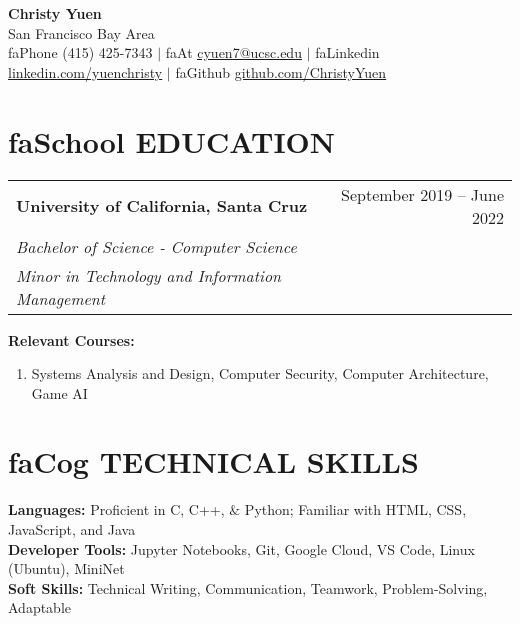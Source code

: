 \documentclass[a4paper,11pt]{article}
\makeatletter
\newcommand{\seticon}[1]{\textcolor{Cerulean}{\csname #1\endcsname}}
\newcommand{\resumeSub}[6]{ %
  \vspace{-2pt}\item
    \begin{tabular*}{0.97\textwidth}[t]{l@{\extracolsep{\fill}}r}
      \textbf{#1} & #2 \\
      \textit{\small#3} & \textnormal{\small #4} \\
      \textit{\small#5} & \textnormal{\small #6} \\
    \end{tabular*}\vspace{-8pt}
}
\newcommand{\resumeSubHeadingListStart}{\begin{itemize}[leftmargin=0.15in, label={}]}
\newcommand{\resumeSubHeadingListEnd}{\end{itemize}}
\makeatother
\begin{document}
\iffalse
\begin{wrapfigure}{R}{0.15\textwidth}
\vspace{-25pt}
\texttt{[image: dp\_cropped]}
\end{wrapfigure}
\fi

\begin{center}
    \textbf{\Huge Christy Yuen} \\
    \normalfont San Francisco Bay Area \vspace{1pt} \\
    \small \seticon{faPhone} (415) 425-7343 $|$ 
    \seticon{faAt} \href{mailto:x@x.com}{\ul{cyuen7@ucsc.edu}} $|$ 
    \seticon{faLinkedin} 
    		\href{https://www.linkedin.com/in/yuenchristy/}{\ul{linkedin.com/yuenchristy}} $|$ 
    \seticon{faGithub} 
    		\href{https://github.com/ChristyYuen}{\ul{github.com/ChristyYuen}}
\end{center}
\vspace{-10pt}

\section{\seticon{faSchool} \textbf{EDUCATION}}
  \resumeSubHeadingListStart
    \resumeSub
      {University of California, Santa Cruz}{September 2019 -- June 2022}
      {Bachelor of Science - Computer Science}{}
      {Minor in Technology and Information Management}{}
      \small{\item{
    	\begin{itemize}[leftmargin=0.15in, label={}]
    		\textbf{Relevant Courses:}{  }
    		\begin{enumerate}[label={}]
         		\vspace{-2pt} \item{ Systems Analysis and Design, Computer Security, Computer Architecture, Game AI}
         \end{enumerate}  
     \end{itemize}\vspace{-3pt} }}      
  \resumeSubHeadingListEnd
  
\section{\seticon{faCog} \textbf{TECHNICAL SKILLS}} %
\begin{itemize}[leftmargin=0.15in, label={}]
    \small{\item{
     \textbf{Languages:}{ Proficient in C, C++, $\&$ Python; Familiar with HTML, CSS, JavaScript, and Java} \\		   
    \textbf{Developer Tools:}{ Jupyter Notebooks, Git, Google Cloud, VS Code, Linux (Ubuntu), MiniNet}\\ 
    \textbf{Soft Skills:}{ Technical Writing, Communication, Teamwork, Problem-Solving, Adaptable}\\
    }}
 \end{itemize} 
 
\end{document}
